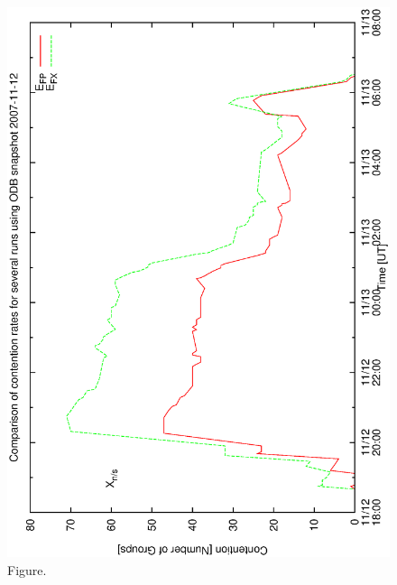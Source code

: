\documentclass[12pt,a4paper]{article}
\begin{document}
\begin{figure}[htbp]
 \begin{center}
  \includegraphics[scale=1.0, angle=0]{figures/bsa01_prex.eps}
 \end{center}
  \caption[Figure.]
{Figure.}
\end{figure}
\clearpage
\end{document}
